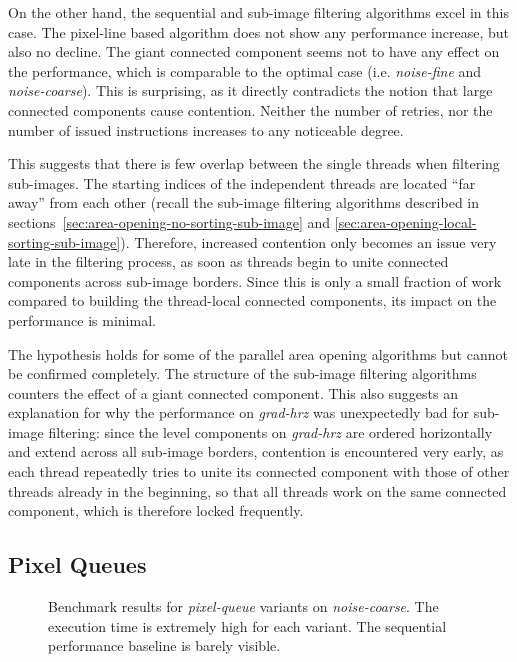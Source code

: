 On the other hand, the sequential and sub-image filtering algorithms excel in
this case. The pixel-line based algorithm does not show any performance
increase, but also no decline. The giant connected component seems not to have
any effect on the performance, which is comparable to the optimal case
(i.e. \emph{noise-fine} and \emph{noise-coarse}). This is surprising, as it
directly contradicts the notion that large connected components cause
contention. Neither the number of retries, nor the number of issued instructions
increases to any noticeable degree.

This suggests that there is few overlap between the single threads when
filtering sub-images. The starting indices of the independent threads are
located ``far away'' from each other (recall the sub-image filtering algorithms
described in sections~\ref{sec:area-opening-no-sorting-sub-image} and
\ref{sec:area-opening-local-sorting-sub-image}). Therefore, increased contention
only becomes an issue very late in the filtering process, as soon as threads
begin to unite connected components across sub-image borders. Since this is only
a small fraction of work compared to building the thread-local connected
components, its impact on the performance is minimal.

The hypothesis holds for some of the parallel area opening algorithms but cannot
be confirmed completely. The structure of the sub-image filtering algorithms
counters the effect of a giant connected component. This also suggests an
explanation for why the performance on \emph{grad-hrz} was unexpectedly
bad for sub-image filtering: since the level components on
\emph{grad-hrz} are ordered horizontally and extend across all sub-image
borders, contention is encountered very early, as each thread repeatedly tries
to unite its connected component with those of other threads already in the
beginning, so that all threads work on the same connected component, which is
therefore locked frequently.

\subsection{Pixel Queues}
\label{sec:experiments-ao-results-pixels}

\begin{figure}
  \centering
  \areaopenplotpixels
  \caption[Benchmark results for \emph{pixel-queue} variants on
  \emph{noise-coarse}.]{Benchmark results for \emph{pixel-queue} variants on
    \emph{noise-coarse}. The execution time is extremely high for each
    variant. The sequential performance baseline is barely visible.}
  \label{fig:pixel-queues}
\end{figure}

